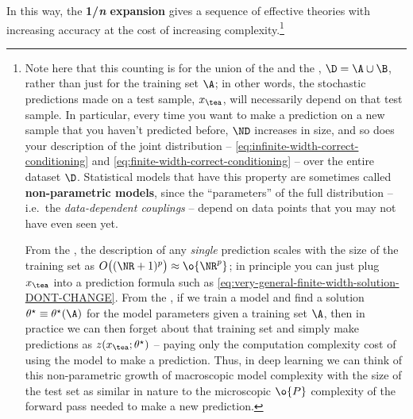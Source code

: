 In this way, the \textbf{1/\emph{n} expansion} gives a sequence of effective theories with increasing accuracy at the cost of increasing complexity.\footnote{
    Note here that this counting is for the union of the  and the , $\D = \A \cup \B$, rather than just for the training set $\A$; in other words, the stochastic predictions made on a test sample, $x_{\tea}$, will necessarily depend on that test sample.
In particular, every time you want to make a prediction on a new sample that you haven't predicted before, $\ND$ increases in size, and so does your description of the joint distribution -- \eqref{eq:infinite-width-correct-conditioning} and \eqref{eq:finite-width-correct-conditioning} -- over the entire dataset $\D$. Statistical models that have this property are sometimes called \textbf{non-parametric models}, since the ``parameters'' of the full distribution -- i.e.~the \emph{data-dependent couplings} --  depend on data points that you may not have even seen yet. 



From the , the description of any \emph{single} prediction scales with the size of the training set as $O\big((\NR + 1)^p\big) \approx \o{\NR^p}$; in principle you can just plug $x_{\tea}$ into a prediction formula such as \eqref{eq:very-general-finite-width-solution-DONT-CHANGE}.
From the , if we train a model and find a solution $\theta^\star \equiv \theta^\star(\A)$ for the model parameters given a training set $\A$, then in practice we can then forget about that training set and simply make predictions as $z(x_{\tea}; \theta^\star)$ --
paying only the computation complexity cost of using the model to make a prediction. %
Thus, in deep learning we can think of this non-parametric growth of macroscopic model complexity with the size of the test set as similar in nature to the microscopic $\o{P}$ complexity of the forward pass needed to make a new prediction.


}
